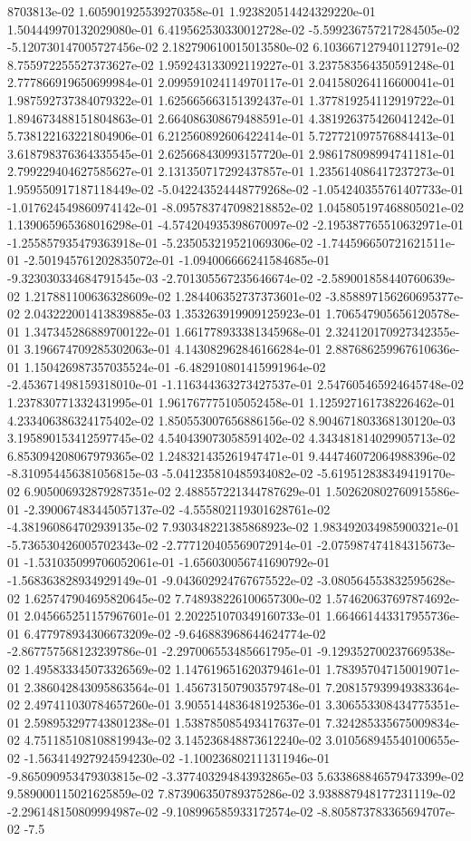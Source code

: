 8703813e-02	1.605901925539270358e-01	1.923820514424329220e-01	1.504449970132029080e-01	6.419562530330012728e-02	-5.599236757217284505e-02	-5.120730147005727456e-02	2.182790610015013580e-02	6.103667127940112791e-02	8.755972255527373627e-02	1.959243133092119227e-01	3.237583564350591248e-01	2.777866919650699984e-01	2.099591024114970117e-01	2.041580264116600041e-01	1.987592737384079322e-01	1.625665663151392437e-01	1.377819254112919722e-01	1.894673488151804863e-01	2.664086308679488591e-01	4.381926375426041242e-01	5.738122163221804906e-01	6.212560892606422414e-01	5.727721097576884413e-01	3.618798376364335545e-01	2.625668430993157720e-01	2.986178098994741181e-01	2.799229404627585627e-01	2.131350717292437857e-01	1.235614086417237273e-01	1.959550917187118449e-02	-5.042243524448779268e-02	-1.054240355761407733e-01	-1.017624549860974142e-01	-8.095783747098218852e-02	1.045805197468805021e-02	1.139065965368016298e-01	-4.574204935398670097e-02	-2.195387765510632971e-01	-1.255857935479363918e-01	-5.235053219521069306e-02	-1.744596650721621511e-01	-2.501945761202835072e-01	-1.094006666241584685e-01	-9.323030334684791545e-03	-2.701305567235646674e-02	-2.589001858440760639e-02	1.217881100636328609e-02	1.284406352737373601e-02	-3.858897156260695377e-02	2.043222001413839885e-03	1.353263919909125923e-01	1.706547905656120578e-01	1.347345286889700122e-01	1.661778933381345968e-01	2.324120170927342355e-01	3.196674709285302063e-01	4.143082962846166284e-01	2.887686259967610636e-01	1.150426987357035524e-01	-6.482910801415991964e-02	-2.453671498159318010e-01	-1.116344363273427537e-01	2.547605465924645748e-02	1.237830771332431995e-01	1.961767775105052458e-01	1.125927161738226462e-01	4.233406386324175402e-02	1.850553007656886156e-02	8.904671803368130120e-03	3.195890153412597745e-02	4.540439073058591402e-02	4.343481814029905713e-02	6.853094208067979365e-02	1.248321435261947471e-01	9.444746072064988396e-02	-8.310954456381056815e-03	-5.041235810485934082e-02	-5.619512838349419170e-02	6.905006932879287351e-02	2.488557221344787629e-01	1.502620802760915586e-01	-2.390067483445057137e-02	-4.555802119301628761e-02	-4.381960864702939135e-02	7.930348221385868923e-02	1.983492034985900321e-01	-5.736530426005702343e-02	-2.777120405569072914e-01	-2.075987474184315673e-01	-1.531035099706052061e-01	-1.656030056741690792e-01	-1.568363828934929149e-01	-9.043602924767675522e-02	-3.080564553832595628e-02	1.625747904695820645e-02	7.748938226100657300e-02	1.574620637697874692e-01	2.045665251157967601e-01	2.202251070349160733e-01	1.664661443317955736e-01	6.477978934306673209e-02	-9.646883968644624774e-02	-2.867757568123239786e-01	-2.297006553485661795e-01	-9.129352700237669538e-02	1.495833345073326569e-02	1.147619651620379461e-01	1.783957047150019071e-01	2.386042843095863564e-01	1.456731507903579748e-01	7.208157939949383364e-02	2.497411030784657260e-01	3.905514483648192536e-01	3.306553308434775351e-01	2.598953297743801238e-01	1.538785085493417637e-01	7.324285335675009834e-02	4.751185108108819943e-02	3.145236848873612240e-02	3.010568945540100655e-02	-1.563414927924594230e-02	-1.100236802111311946e-01	-9.865090953479303815e-02	-3.377403294843932865e-03	5.633868846579473399e-02	9.589000115021625859e-02	7.873906350789375286e-02	3.938887948177231119e-02	-2.296148150809994987e-02	-9.108996585933172574e-02	-8.805873783365694707e-02	-7.5